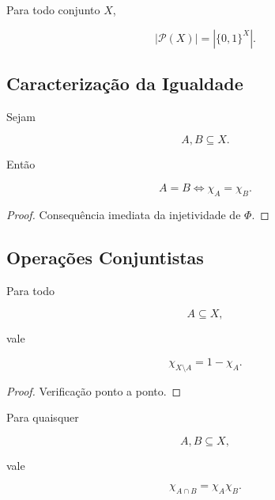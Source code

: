\documentclass[../../main]{subfiles}
\begin{document}
\begin{cor}

	Para todo conjunto \(X\),

	\[
		|\mathcal P(X)|
		=
		|\{0,1\}^X|.
	\]

\end{cor}

\subsection{Caracterização da Igualdade}

\begin{prop}
	\label{prop:matematica:funcoes:caracteristicas:igualdade}

	Sejam

	\[
		A,B\subseteq X.
	\]

	Então

	\[
		A=B
		\iff
		\chi_A=\chi_B.
	\]

\end{prop}

\begin{proof}

	Consequência imediata da injetividade de \(\Phi\).

\end{proof}

\subsection{Operações Conjuntistas}

\begin{prop}[Complemento]
	\label{prop:matematica:funcoes:caracteristicas:complemento}

	Para todo

	\[
		A\subseteq X,
	\]

	vale

	\[
		\chi_{X\setminus A}
		=
		1-\chi_A.
	\]

\end{prop}

\begin{proof}

	Verificação ponto a ponto.

\end{proof}

\begin{prop}[Interseção]
	\label{prop:matematica:funcoes:caracteristicas:intersecao}

	Para quaisquer

	\[
		A,B\subseteq X,
	\]

	vale

	\[
		\chi_{A\cap B}
		=
		\chi_A\chi_B.
	\]

\end{prop}
\end{document}
